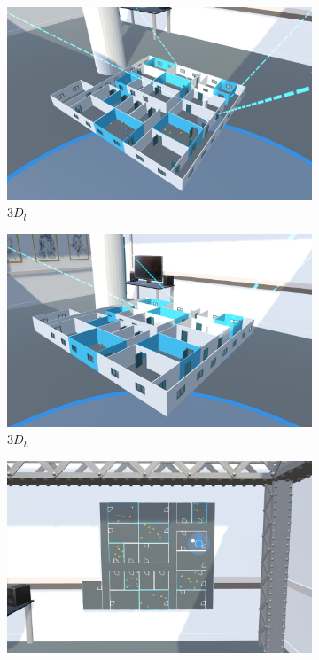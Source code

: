 \begin{figure}[h]
    \begin{subfigure}{0.33\linewidth}
        \centering
        \includegraphics[width=\linewidth]{figures/screenshots/condition_3d_l_x}
        \caption{$3D_l$}
    \end{subfigure}%
    \hfill
    \begin{subfigure}{0.33\linewidth}
        \centering
        \includegraphics[width=\linewidth]{figures/screenshots/condition_3d_h_x}
        \caption{$3D_h$}
    \end{subfigure}%
    \hfill
    \begin{subfigure}{0.33\linewidth}
        \centering
        \includegraphics[width=\linewidth]{figures/screenshots/condition_2d_x}

\end{subfigure}
\end{figure}
